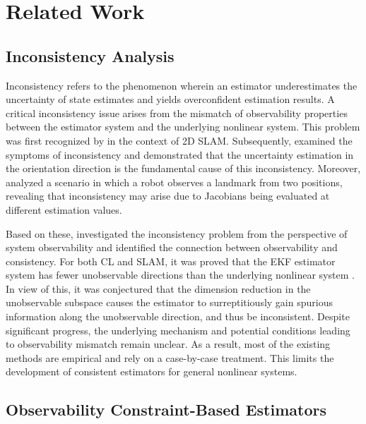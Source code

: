 \section{Related Work}
\label{sec:related_work}

\subsection{Inconsistency Analysis}

Inconsistency refers to the phenomenon wherein an estimator underestimates the uncertainty of state estimates and yields overconfident estimation results. A critical inconsistency issue arises from the mismatch of observability properties between the estimator system and the underlying nonlinear system. This problem was first recognized by \cite{B28} in the context of 2D SLAM. Subsequently, \cite{B15} examined the symptoms of inconsistency and demonstrated that the uncertainty estimation in the orientation direction is the fundamental cause of this inconsistency. Moreover, \cite{B24} analyzed a scenario in which a robot observes a landmark from two positions, revealing that inconsistency may arise due to Jacobians being evaluated at different estimation values.

Based on these, \cite{B16} investigated the inconsistency problem from the perspective of system observability and identified the connection between observability and consistency. For both CL and SLAM, it was proved that the EKF estimator system has fewer unobservable directions than the underlying nonlinear system \cite{B6, B13, B14}. In view of this, it was conjectured that the dimension reduction in the unobservable subspace causes the estimator to surreptitiously gain spurious information along the unobservable direction, and thus be inconsistent. Despite significant progress, the underlying mechanism and potential conditions leading to observability mismatch remain unclear. As a result, most of the existing methods are empirical and rely on a case-by-case treatment. This limits the development of consistent estimators for general nonlinear systems.


\subsection{Observability Constraint-Based Estimators}

